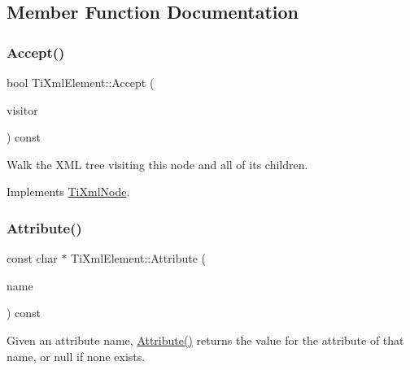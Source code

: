 \subsection{Member Function Documentation}
\mbox{\label{class_ti_xml_element_a01d33358cce9d1817b557d314dda3779}} 
\subsubsection{\texorpdfstring{Accept()}{Accept()}}
{\footnotesize\ttfamily bool Ti\+Xml\+Element\+::\+Accept (\begin{DoxyParamCaption}\item[{\hyperlink{class_ti_xml_visitor}{Ti\+Xml\+Visitor} $\ast$}]{visitor }\end{DoxyParamCaption}) const\hspace{0.3cm}{\ttfamily [virtual]}}

Walk the X\+ML tree visiting this node and all of its children. 

Implements \hyperlink{class_ti_xml_node_acc0f88b7462c6cb73809d410a4f5bb86}{Ti\+Xml\+Node}.

\mbox{\label{class_ti_xml_element_a6042f518748f475a7ac4b4e0b509eb05}} 
\subsubsection{\texorpdfstring{Attribute()}{Attribute()}\hspace{0.1cm}{\footnotesize\ttfamily [1/3]}}
{\footnotesize\ttfamily const char $\ast$ Ti\+Xml\+Element\+::\+Attribute (\begin{DoxyParamCaption}\item[{const char $\ast$}]{name }\end{DoxyParamCaption}) const}

Given an attribute name, \hyperlink{class_ti_xml_element_a6042f518748f475a7ac4b4e0b509eb05}{Attribute()} returns the value for the attribute of that name, or null if none exists. \mbox{\label{class_ti_xml_element_a8005d0b808fd02bd1246710cdf95e5f6}} 

